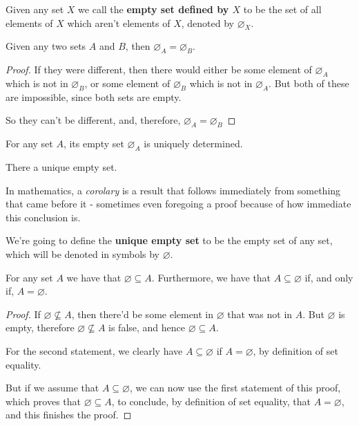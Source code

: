 \begin{df}
	Given any set $X$ we call the \textbf{empty set defined by $X$} to be the set of all elements of $X$ which aren't elements of $X$, denoted by $\varnothing_X$.
\end{df}

\begin{theorem}
	Given any two sets $A$ and $B$, then $\varnothing_A=\varnothing_B$.
\end{theorem}
\begin{proof}
	If they were different, then there would either be some element of $\varnothing_A$ which is not in $\varnothing_B$, or some element of $\varnothing_B$ which is not in $\varnothing_A$. But both of these are impossible, since both sets are empty.
	
	So they can't be different, and, therefore, $\varnothing_A=\varnothing_B$
\end{proof}
\begin{cor}
	For any set $A$, its empty set $\varnothing_A$ is uniquely determined.
\end{cor}
\begin{cor}
	There a unique empty set.
\end{cor}

\begin{rmk}
	In mathematics, a \emph{corolary} is a result that follows immediately from something that came before it - sometimes even foregoing a proof because of how immediate this conclusion is.
\end{rmk}

\begin{df}
	We're going to define the \textbf{unique empty set} to be the empty set of any set, which will be denoted in symbols by $\varnothing$.
\end{df}

\begin{prop}
	For any set $A$ we have that $\varnothing\subseteq A$. Furthermore, we have that $A\subseteq\varnothing$ if, and only if, $A=\varnothing$.
\end{prop}
\begin{proof}
	If $\varnothing\not\subseteq A$, then there'd be some element in $\varnothing$ that was not in $A$. But $\varnothing$ is empty, therefore $\varnothing\not\subseteq A$ is false, and hence $\varnothing \subseteq A$.
	
	\bigskip
	For the second statement, we clearly have $A\subseteq \varnothing$ if $A=\varnothing$, by definition of set equality.
	
	But if we assume that $A\subseteq\varnothing$, we can now use the first statement of this proof, which proves that $\varnothing\subseteq A$, to conclude, by definition of set equality, that $A=\varnothing$, and this finishes the proof.
\end{proof}

